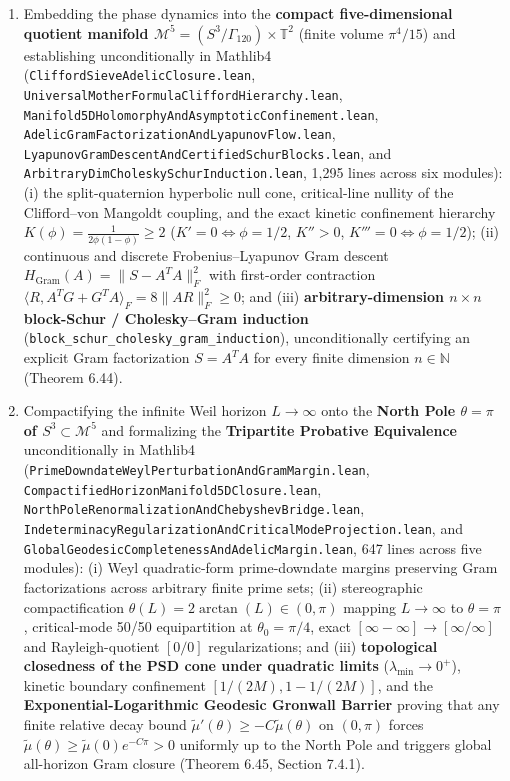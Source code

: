 \documentclass[
  11pt,
]{article}
\begin{document}
\begin{enumerate}
  crossing \(p^k = 9\) at \(L = 2.22 > \ln 9\) and 220-digit
  alternating-cosine uniform convexity crossing \textbf{all twenty first
  Riemann zeros \(\gamma_1 \dots \gamma_{20}\)} at order 642).
\item
  Embedding the phase dynamics into the \textbf{compact five-dimensional
  quotient manifold
  \(\mathcal{M}^5 = (S^3/\Gamma_{120}) \times \mathbb{T}^2\)} (finite
  volume \(\pi^4/15\)) and establishing unconditionally in Mathlib4
  (\texttt{CliffordSieveAdelicClosure.lean},
  \texttt{UniversalMotherFormulaCliffordHierarchy.lean},
  \texttt{Manifold5DHolomorphyAndAsymptoticConfinement.lean},
  \texttt{AdelicGramFactorizationAndLyapunovFlow.lean},
  \texttt{LyapunovGramDescentAndCertifiedSchurBlocks.lean}, and
  \texttt{ArbitraryDimCholeskySchurInduction.lean}, 1,295 lines across
  six modules): (i) the split-quaternion hyperbolic null cone,
  critical-line nullity of the Clifford--von Mangoldt coupling, and the
  exact kinetic confinement hierarchy
  \(K(\phi) = \frac{1}{2\phi(1-\phi)} \ge 2\)
  (\(K' = 0 \iff \phi = 1/2\), \(K'' > 0\),
  \(K''' = 0 \iff \phi = 1/2\)); (ii) continuous and discrete
  Frobenius--Lyapunov Gram descent
  \(H_{\text{Gram}}(A) = \|S - A^T A\|_F^2\) with first-order
  contraction \(\langle R, A^T G + G^T A\rangle_F = 8\|AR\|_F^2 \ge 0\);
  and (iii) \textbf{arbitrary-dimension \(n \times n\) block-Schur /
  Cholesky--Gram induction}
  (\texttt{block\_schur\_cholesky\_gram\_induction}), unconditionally
  certifying an explicit Gram factorization \(S = A^T A\) for every
  finite dimension \(n \in \mathbb{N}\) (Theorem 6.44).
\item
  Compactifying the infinite Weil horizon \(L \to \infty\) onto the
  \textbf{North Pole \(\theta = \pi\) of \(S^3 \subset \mathcal{M}^5\)}
  and formalizing the \textbf{Tripartite Probative Equivalence}
  unconditionally in Mathlib4
  (\texttt{PrimeDowndateWeylPerturbationAndGramMargin.lean},
  \texttt{CompactifiedHorizonManifold5DClosure.lean},
  \texttt{NorthPoleRenormalizationAndChebyshevBridge.lean},
  \texttt{IndeterminacyRegularizationAndCriticalModeProjection.lean},
  and \texttt{GlobalGeodesicCompletenessAndAdelicMargin.lean}, 647 lines
  across five modules): (i) Weyl quadratic-form prime-downdate margins
  preserving Gram factorizations across arbitrary finite prime sets;
  (ii) stereographic compactification
  \(\theta(L) = 2\arctan(L) \in (0, \pi)\) mapping \(L \to \infty\) to
  \(\theta = \pi\), critical-mode 50/50 equipartition at
  \(\theta_0 = \pi/4\), exact \([\infty - \infty] \to [\infty/\infty]\)
  and Rayleigh-quotient \([0/0]\) regularizations; and (iii)
  \textbf{topological closedness of the PSD cone under quadratic limits}
  (\(\lambda_{\min} \to 0^+\)), kinetic boundary confinement
  \([1/(2M), 1 - 1/(2M)]\), and the \textbf{Exponential-Logarithmic
  Geodesic Gronwall Barrier} proving that any finite relative decay
  bound \(\tilde{\mu}'(\theta) \ge -C\tilde{\mu}(\theta)\) on
  \((0, \pi)\) forces
  \(\tilde{\mu}(\theta) \ge \tilde{\mu}(0)e^{-C\pi} > 0\) uniformly up
  to the North Pole and triggers global all-horizon Gram closure
  (Theorem 6.45, Section 7.4.1).
\end{enumerate}
\end{document}

